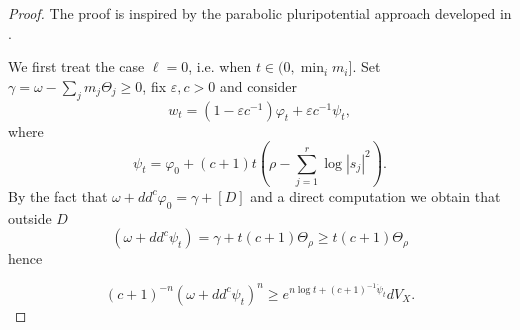 \documentclass[11pt]{amsart}
\numberwithin{equation}{section}
\begin{document}
\begin{proof}
The proof is inspired by the parabolic pluripotential approach developed in \cite{GLZ20}.

We first treat the case $\ell=0$, i.e. when $t \in (0, \min_i m_i]$.
Set $\gamma = \omega-\sum_jm_j\Theta_j \geq 0$,
fix $\varepsilon,c>0 $ and consider 
	\[
	w_t = (1-\varepsilon c^{-1}) \varphi_t + \varepsilon c^{-1}  \psi_t,
	\]
	where 
	\[
	\psi_t = \varphi_0 + (c+1)t \left(\rho-\sum_{j=1}^r \log|s_j|^2\right). 
	\]
By the fact that $\omega+dd^c \varphi_0=\gamma+[D]$ and a direct computation we obtain that outside $D$
	\[
	(\omega+dd^c \psi_t) = \gamma + t (c+1)\Theta_\rho \geq t (c+1) \Theta_\rho
	\]
	hence

	\[
	(c+1)^{-n}(\omega+dd^c \psi_t)^n \geq e^{n\log t+ (c+1)^{-1}\dot{\psi}_t} dV_X. 
	\]
	

\end{proof}
\end{document}
